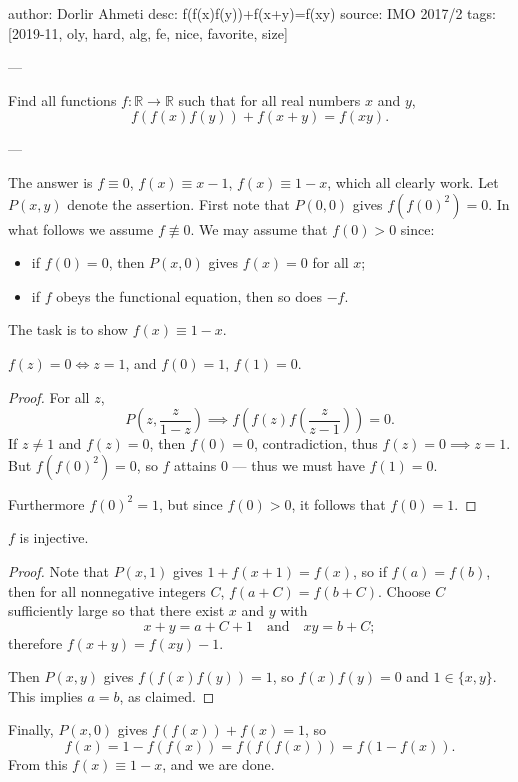author: Dorlir Ahmeti
desc: f(f(x)f(y))+f(x+y)=f(xy)
source: IMO 2017/2
tags: [2019-11, oly, hard, alg, fe, nice, favorite, size]

---

Find all functions $f:\mathbb R\to\mathbb R$ such that for all real numbers $x$ and $y$, \[f(f(x)f(y))+f(x+y)=f(xy).\]

---

The answer is $f\equiv0$, $f(x)\equiv x-1$, $f(x)\equiv 1-x$, which all clearly work. Let $P(x,y)$ denote the assertion. First note that $P(0,0)$ gives $f(f(0)^2)=0$. In what follows we assume $f\not\equiv0$. We may assume that $f(0)>0$ since:
\begin{itemize}[itemsep=0em]
    \item if $f(0)=0$, then $P(x,0)$ gives $f(x)=0$ for all $x$;
    \item if $f$ obeys the functional equation, then so does $-f$.
\end{itemize}
The task is to show $f(x)\equiv1-x$.

\begin{claim}
    $f(z)=0\iff z=1$, and $f(0)=1$, $f(1)=0$.
\end{claim}
\begin{proof}
    For all $z$, \[P\left(z,\frac z{1-z}\right)\implies f\left(f(z)f\left(\frac z{z-1}\right)\right)=0.\]
    If $z\ne1$ and $f(z)=0$, then $f(0)=0$, contradiction, thus $f(z)=0\implies z=1$. But $f(f(0)^2)=0$, so $f$ attains $0$ --- thus we must have $f(1)=0$.

    Furthermore $f(0)^2=1$, but since $f(0)>0$, it follows that $f(0)=1$.
\end{proof}
\begin{claim}
    $f$ is injective.
\end{claim}
\begin{proof}
    Note that $P(x,1)$ gives $1+f(x+1)=f(x)$, so if $f(a)=f(b)$, then for all nonnegative integers $C$, $f(a+C)=f(b+C)$. Choose $C$ sufficiently large so that there exist $x$ and $y$ with \[x+y=a+C+1\quad\text{and}\quad xy=b+C;\]
    therefore $f(x+y)=f(xy)-1$.

    Then $P(x,y)$ gives $f(f(x)f(y))=1$, so $f(x)f(y)=0$ and $1\in\{x,y\}$. This implies $a=b$, as claimed.
\end{proof}

Finally, $P(x,0)$ gives $f(f(x))+f(x)=1$, so \[f(x)=1-f(f(x))=f(f(f(x)))=f(1-f(x)).\]
From this $f(x)\equiv1-x$, and we are done.
